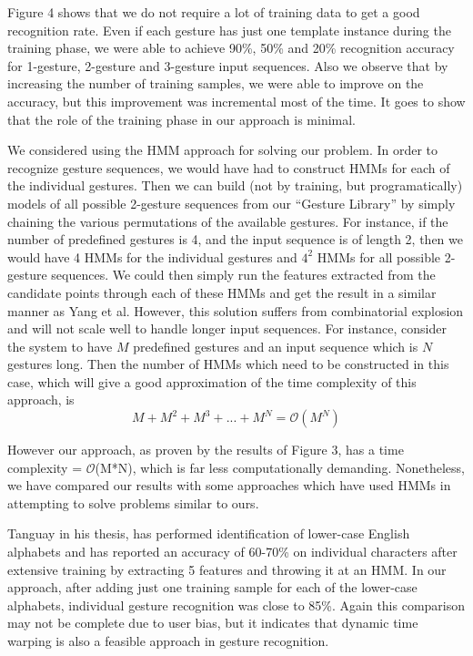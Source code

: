 \documentclass[twoside]{article}
\newcommand{\bigO}{\ensuremath{\mathcal{O}}}
\begin{document}
\begin{multicols}{2}
Figure 4 shows that we do not require a lot of training data to get a good
recognition rate. Even if each gesture has just one template instance during the
training phase, we were able to achieve 90\%, 50\% and 20\% recognition accuracy
for 1-gesture, 2-gesture and 3-gesture input sequences. Also we observe that by
increasing the number of training samples, we were able to improve on the
accuracy, but this improvement was incremental most of the time. It goes to show
that the role of the training phase in our approach is minimal.

We considered using the HMM approach for solving our problem. In order to
recognize gesture sequences, we would have had to construct HMMs for each of the
individual gestures. Then we can build (not by training, but programatically)
models of all possible 2-gesture sequences from our ``Gesture Library'' by
simply chaining the various permutations of the available gestures. %
For instance, if the number of predefined gestures is 4, and the input sequence
is of length 2, then we would have 4 HMMs for the individual gestures and $4^2$
HMMs for all possible 2-gesture sequences. We could then simply run the features
extracted from the candidate points through each of these HMMs and get the
result in a similar manner as Yang et al. However, this solution suffers from
combinatorial explosion and will not scale well to handle longer input
sequences. For instance, consider the system to have $M$ predefined gestures and
an input sequence which is $N$ gestures long. Then the number of HMMs which need
to be constructed in this case, which will give a good approximation of the time
complexity of this approach, is
\[
	M + M^2 + M^3 + ... + M^N = \bigO{(M^N)}
\]

However our approach, as proven by the results of Figure 3, has a time
complexity = \bigO{(M*N)}, which is far less computationally demanding.
Nonetheless, we have compared our results with some approaches which have used
HMMs in attempting to solve problems similar to ours.


Tanguay \cite{tanguay_jr_hidden_1995} in his thesis, has performed
identification of lower-case English alphabets and has reported an accuracy of
60-70\% on individual characters after extensive training by extracting 5
features and throwing it at an HMM. In our approach, after adding just one
training sample for each of the lower-case alphabets, individual gesture
recognition was close to 85\%. Again this comparison may not be complete due to
user bias, but it indicates that dynamic time warping is also a feasible
approach in gesture recognition.


\end{multicols}
\end{document}
